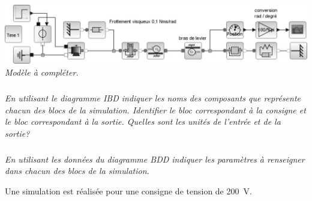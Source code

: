\documentclass[10pt,fleqn]{article} %
\begin{document}
\begin{multicols}{2}




\begin{center}
\includegraphics[width=.95\linewidth]{images/fig_05}
\textit{Modèle à compléter.}
\end{center}
%

%


\subparagraph{}\textit{En utilisant le diagramme IBD indiquer les noms des composants que représente chacun des blocs de la simulation. Identifier le bloc correspondant à la consigne et le bloc correspondant à la sortie. Quelles sont les unités de l'entrée et de la sortie?}
%

\subparagraph{}\textit{ En utilisant les données du diagramme BDD indiquer les paramètres à renseigner dans chacun des blocs de la simulation.}
 
Une simulation est réalisée pour une consigne de tension de \SI{200}{V}.



\end{multicols}
\end{document}
